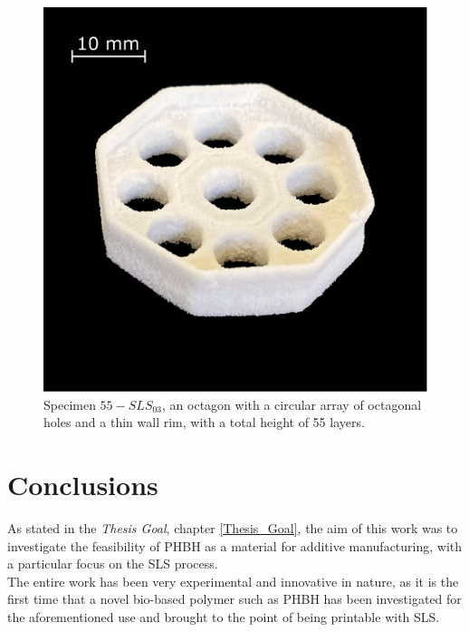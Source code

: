 \documentclass{article}
\begin{document}
        \begin{figure}[h!]
            \centering
            \includegraphics[width=\textwidth]{Pictures/Printed_parts/Fixed/octagon_holes.eps}
            \caption{Specimen $55-SLS_{03}$, an octagon with a circular array of octagonal holes and a thin wall rim, with a total height of 55 layers.}
            \label{fig:printed_specimens_octagonholes}
        \end{figure}
        

        \clearpage

    
    \section{Conclusions\label{conclusions}}

    As stated in the \textit{Thesis Goal}, chapter \ref{Thesis_Goal}, the aim of this work was to investigate the feasibility of PHBH as a 
    material for additive manufacturing, with a particular focus on the SLS process. \\ 

    The entire work has been very experimental and innovative in nature, as it is the first time that a novel bio-based polymer such as PHBH has been investigated 
    for the aforementioned use and brought to the point of being printable with SLS. \\
    
\end{document}
